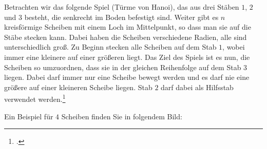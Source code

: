 \documentclass{lehramt-informatik-aufgabe}
\begin{document}

Betrachten wir das folgende Spiel (Türme von Hanoi), das aus drei Stäben
$1$, $2$ und $3$ besteht, die senkrecht im Boden befestigt sind. Weiter
gibt es $n$ kreisförmige Scheiben mit einem Loch im Mittelpunkt, so dass
man sie auf die Stäbe stecken kann. Dabei haben die Scheiben
verschiedene Radien, alle sind unterschiedlich groß. Zu Beginn stecken
alle Scheiben auf dem Stab $1$, wobei immer eine kleinere auf einer
größeren liegt. Das Ziel des Spiels ist es nun, die Scheiben so
umzuordnen, dass sie in der gleichen Reihenfolge auf dem Stab $3$
liegen. Dabei darf immer nur eine Scheibe bewegt werden und es darf nie
eine größere auf einer kleineren Scheibe liegen. Stab $2$ darf dabei als
Hilfsstab verwendet werden.\footcite[Aufgabe 2]{aud:ab:7}

Ein Beispiel für $4$ Scheiben finden Sie in folgendem Bild:

\begin{center}
\end{center}

\begin{center}
\end{center}
\end{document}

